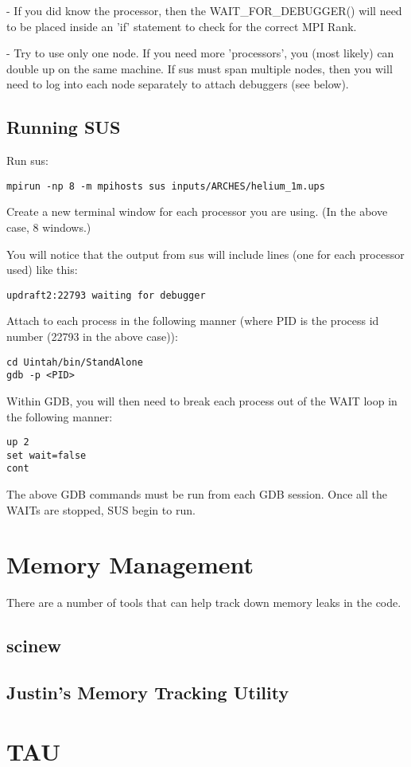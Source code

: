 - If you did know the processor, then the WAIT_FOR_DEBUGGER() will
need to be placed inside an 'if' statement to check for the correct
MPI Rank.

- Try to use only one node.  If you need more 'processors', you (most
likely) can double up on the same machine.  If sus must span multiple
nodes, then you will need to log into each node separately to attach
debuggers (see below).

\subsection{Running SUS}

Run sus:

\begin{Verbatim}
mpirun -np 8 -m mpihosts sus inputs/ARCHES/helium_1m.ups
\end{Verbatim}

Create a new terminal window for each processor you are using.  (In
the above case, 8 windows.)  

You will notice that the output from sus will include lines (one for
each processor used) like this:

\begin{Verbatim}
updraft2:22793 waiting for debugger
\end{Verbatim}

Attach to each process in the following manner (where PID is the
process id number (22793 in the above case)):

\begin{Verbatim}
cd Uintah/bin/StandAlone
gdb -p <PID>
\end{Verbatim}

Within GDB, you will then need to break each process out of the WAIT loop in the
following manner:

\begin{Verbatim}
up 2
set wait=false
cont
\end{Verbatim}

The above GDB commands must be run from each GDB session.  Once all
the WAITs are stopped, SUS begin to run.

\section{Memory Management}

There are a number of tools that can help track down memory leaks in
the code.

\subsection{scinew}

\subsection{Justin's Memory Tracking Utility}

\section{TAU}

